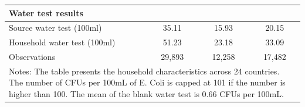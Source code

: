 \begin{table}[htbp]
\begin{tabular}{l*{3}{c}}
\textbf{Water test results} \\\hline Source water test (100ml)&       35.11&       15.93&       20.15\\
Household water test (100ml)&       51.23&       23.18&       33.09\\
\hline
Observations        &      29,893&      12,258&      17,482\\
\hline\hline
\multicolumn{4}{p{0.85\linewidth}}{\footnotesize Notes: The table presents the household characteristics across 24 countries. The number of CFUs per 100mL of E. Coli is capped at 101 if the number is higher than 100. The mean of the blank water test is 0.66 CFUs per 100mL.}\\
\end{tabular}
\end{table}
